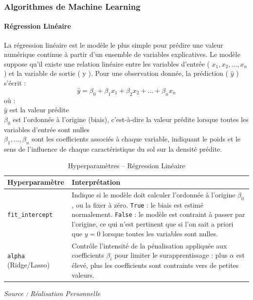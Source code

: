 \documentclass[a4paper,12pt, oneside]{article}
\begin{document}
\subsubsection{Algorithmes de Machine Learning}
\paragraph{Régression Linéaire\\}

La régression linéaire est le modèle le plus simple pour prédire une valeur numérique continue à partir d'un ensemble de variables explicatives. Le modèle suppose qu'il existe une relation linéaire entre les variables d'entrée ( $x_1, x_2, \dots, x_n$ ) et la variable de sortie ( y ). Pour une observation donnée, la prédiction ( $\hat{y}$ ) s'écrit :
\[
\hat{y} = \beta_0 + \beta_1 x_1 + \beta_2 x_2 + \dots + \beta_n x_n
\]
où :\\
$\hat{y}$ est la valeur prédite\\
$\beta_0$ est l'ordonnée à l'origine (biais), c'est-à-dire la valeur prédite lorsque toutes les variables d'entrée sont nulles\\
$\beta_1, \dots, \beta_n$ sont les coefficients associés à chaque variable, indiquant le poids et le sens de l'influence de chaque caractéristique du sol sur la densité prédite.\\

\begin{table}[H]
\centering
\begin{tabular}{|m{5cm}|m{12cm}|}
\hline
\textbf{Hyperparamètre} & \textbf{Interprétation} \\
\hline
\texttt{fit\_intercept} & Indique si le modèle doit calculer l'ordonnée à l'origine $\beta_0$, ou la fixer à zéro. \texttt{True} : le biais est estimé normalement. \newline \texttt{False} : le modèle est contraint à passer par l'origine, ce qui n'est pertinent que si l'on sait a priori que $y=0$ lorsque toutes les variables sont nulles. \\
\hline
\texttt{alpha} (Ridge/Lasso) & Contrôle l'intensité de la pénalisation appliquée aux coefficients $\beta_i$ pour limiter le surapprentissage : plus $\alpha$ est élevé, plus les coefficients sont contraints vers de petites valeurs. \\
\hline
\end{tabular}
\caption{Hyperparamètres -- Régression Linéaire}
\textit{Source : Réalisation Personnelle}
\end{table}
\end{document}
